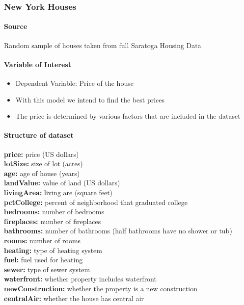 \documentclass[letterpaper,9pt,twocolumn,twoside,]{pinp}
\providecommand{\tightlist}{%
  \setlength{\itemsep}{0pt}\setlength{\parskip}{0pt}}
\begin{document}
\hypertarget{new-york-houses}{%
\subsubsection{New York Houses}\label{new-york-houses}}

\hypertarget{source}{%
\paragraph{\texorpdfstring{\textbf{Source}}{Source}}\label{source}}

Random sample of houses taken from full Saratoga Housing Data

\hypertarget{variable-of-interest}{%
\paragraph{\texorpdfstring{\textbf{Variable of
Interest}}{Variable of Interest}}\label{variable-of-interest}}

\begin{itemize}
\tightlist
\item
  Dependent Variable: Price of the house
\item
  With this model we intend to find the best prices
\item
  The price is determined by various factors that are included in the
  dataset
\end{itemize}

\hypertarget{structure-of-dataset}{%
\paragraph{Structure of dataset}\label{structure-of-dataset}}

\textbf{price:} price (US dollars)\\
\textbf{lotSize:} size of lot (acres)\\
\textbf{age:} age of house (years)\\
\textbf{landValue:} value of land (US dollars)\\
\textbf{livingArea:} living are (square feet)\\
\textbf{pctCollege: }percent of neighborhood that graduated college\\
\textbf{bedrooms: }number of bedrooms\\
\textbf{fireplaces: }number of fireplaces\\
\textbf{bathrooms: }number of bathrooms (half bathrooms have no shower
or tub)\\
\textbf{rooms: }number of rooms\\
\textbf{heating: }type of heating system\\
\textbf{fuel: }fuel used for heating\\
\textbf{sewer: }type of sewer system\\
\textbf{waterfront: }whether property includes waterfront\\
\textbf{newConstruction: }whether the property is a new construction\\
\textbf{centralAir: }whether the house has central air
\end{document}
